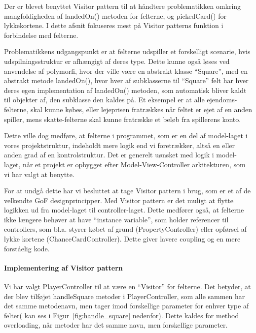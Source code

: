 \documentclass[class=article, crop=false]{standalone}
\begin{document}
        Der er blevet benyttet Visitor pattern til at håndtere problematikken omkring mangfoldigheden af landedOn() metoden for felterne, og pickedCard() for lykkekortene. I dette afsnit fokuseres mest på Visitor patterns funktion i forbindelse med felterne. \par
        Problematikkens udgangspunkt er at felterne udspiller et forskelligt scenarie, hvis udspilningsstruktur er afhængigt af deres type. Dette kunne også løses ved anvendelse af polymorfi, hvor der ville være en abstrakt klasse “Square”, med en abstrakt metode landedOn(), hvor hver af subklasserne til “Square” felt har hver deres egen implementation af landedOn() metoden, som automatisk bliver kaldt til objekter af, den subklasse den kaldes på. Et eksempel er at alle ejendoms-felterne, skal kunne købes, eller lejeprisen fratrækkes når feltet er ejet af en anden spiller, mens skatte-felterne skal kunne fratrække et beløb fra spillerens konto. \par
        Dette ville dog medføre, at felterne i programmet, som er en del af model-laget i vores projektstruktur, indeholdt mere logik end vi foretrækker, altså en eller anden grad af en kontrolstruktur. Det er generelt uønsket med logik i model-laget, når et projekt er opbygget efter Model-View-Controller arkitekturen, som vi har valgt at benytte. \par
        For at undgå dette har vi besluttet at tage Visitor pattern i brug, som er et af de velkendte GoF designprincipper. Med Visitor pattern er det muligt at flytte logikken ud fra model-laget til controller-laget. Dette medfører også, at felterne ikke længere behøver at have “instance variable”, som holder referencer til controllers, som bl.a. styrer købet af grund (PropertyController) eller opførsel af lykke kortene (ChanceCardController). Dette giver lavere coupling og en mere forståelig kode.\par
\paragraph{Implementering af Visitor pattern \newline}
        Vi har valgt PlayerController til at være en “Visitor” for felterne. Det betyder, at der blev tilføjet handleSquare metoder i PlayerController, som alle sammen har det samme metodenavn, men tager imod forskellige parameter for enhver type af felter( kan ses i Figur~\ref{fig:handle_square} nedenfor). Dette kaldes for method overloading, når metoder har det samme navn, men forskellige parameter.
\end{document}
